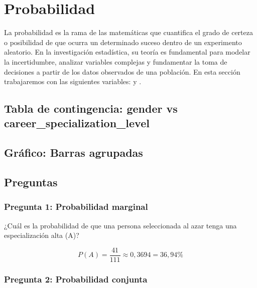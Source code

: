 \section{Probabilidad}
La probabilidad es la rama de las matemáticas que cuantifica el grado de certeza o posibilidad de
que ocurra un determinado suceso dentro de un experimento aleatorio. En la investigación
estadística, su teoría es fundamental para modelar la incertidumbre, analizar variables complejas y
fundamentar la toma de decisiones a partir de los datos observados de una población. En esta sección
trabajaremos con las siguientes variables:
 y .

\subsection{Tabla de contingencia: gender vs career\_specialization\_level}


\subsection{Gráfico: Barras agrupadas}



\subsection{Preguntas}

\subsubsection{Pregunta 1: Probabilidad marginal}

¿Cuál es la probabilidad de que una persona seleccionada al azar tenga una especialización alta
(A)?

\Respuesta
\[ P(A) = \frac{41}{111} \approx 0{,}3694 = 36{,}94\% \]



\subsubsection{Pregunta 2: Probabilidad conjunta}

